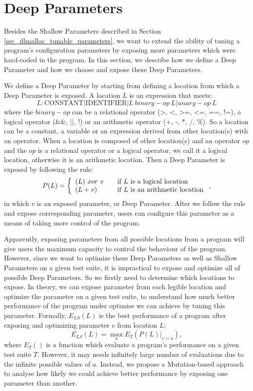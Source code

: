 \section{Deep Parameters}
Besides the Shallow Parameters described in Section \ref{sec_dlmalloc_tunable_parameters}, we want to extend the ability of tuning a program's configuration parameters by exposing more parameters which were hard-coded in the program. In this section, we describe how we define a Deep Parameter and how we choose and expose these Deep Parameters.

We define a Deep Parameter by starting from defining a location from which a Deep Parameter is exposed. A location $L$ is an expression that meets:
\begin{equation}
L: \mbox{CONSTANT} | \mbox{IDENTIFIER} | L\ binary-op\ L | unary-op\ L
\end{equation}
where the $binary-op$ can be a relational operator (>, <, >=, <=, ==, !=), a logical operator (\&\&, ||, !) or an arithmetic operator (+, -, *, /, \%). So a location can be a constant, a variable or an expression derived from other location(s) with an operator. When a location is composed of other location(s) and an operator $op$ and the $op$ is a relational operator or a logical operator, we call it a logical location, otherwise it is an arithmetic location. Then a Deep Parameter is exposed by following the rule:
\begin{equation}
 P(L) = \left\{
  \begin{array}{l l}
    (L) \ xor \ v & \quad \text{if $L$ is a logical location}\\
    (L + v) & \quad \text{if $L$ is an arithmetic location}
  \end{array} \right.,
\end{equation}
in which $v$ is an exposed parameter, or Deep Parameter. After we follow the rule and expose corresponding parameter, users can configure this parameter as a means of taking more control of the program.

Apparently, exposing parameters from all possible locations from a program will give users the maximum capacity to control the behaviour of the program. However, since we want to optimize these Deep Parameters as well as Shallow Parameters on a given test suite, it is impractical to expose and optimize all of possible Deep Parameters. So we firstly need to determine which locations to expose. In theory, we can expose parameter from each legible location and optimize the parameter on a given test suite, to understand how much better performance of the program under optimise we can achieve by tuning this parameter. Formally, $E_{LS}(L)$ is the best performance of a program after exposing and optimizing parameter $v$ from location $L$:
\begin{equation}
E_{LS}(L)=\max_{a} E_T(P(L)|_{v=a}),
\end{equation}
where $E_T()$ is a function which evaluate a program's performance on a given test suite $T$. However, it may needs infinitely large number of evaluations due to the infinite possible values of $a$. Instead, we propose a Mutation-based approach to analyse how likely we could achieve better performance by exposing one parameter than another.

